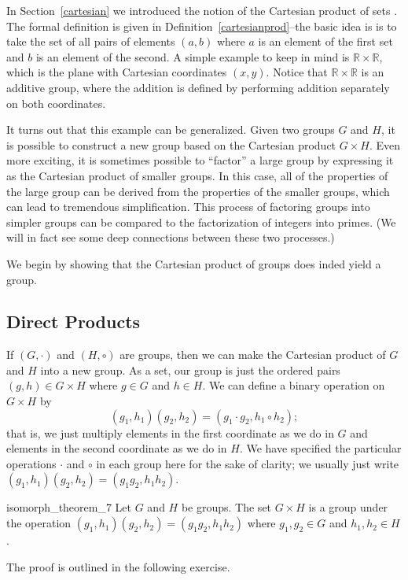 In Section~\ref{cartesian} we introduced the notion of the Cartesian product of sets . The formal definition is given in Definition~\ref{cartesianprod}--the basic idea is is to take the set of all pairs of elements $(a,b)$ where $a$ is an element of the first set and $b$ is an element of the second. A simple example to keep in mind is ${\mathbb R} \times {\mathbb R}$, which is the plane with Cartesian coordinates $(x,y)$. Notice that ${\mathbb R} \times {\mathbb R}$ is an additive group, where the addition is defined by performing addition separately on both coordinates. 

It turns out that this example can be generalized. Given two groups $G$ and $H$, it is possible to construct a new group based on the Cartesian product $G \times H$.  Even more exciting,  it is sometimes possible to ``factor'' a large group by expressing it as the Cartesian product of smaller groups. In this case, all of the properties of the large group can be derived from the properties of the smaller groups, which can lead to tremendous simplification. This  process of factoring groups into simpler groups can be compared to the factorization of integers into primes. (We will in fact see some deep connections between these two processes.)

We begin by showing that the Cartesian product of groups does inded yield a group.  
 
 
\subsection{ Direct Products}

If $(G,\cdot)$ and $(H, \circ)$ are groups, then we can make the Cartesian product of $G$ and $H$ into a new group.  As a set, our group is just the ordered pairs $(g, h) \in G \times H$ where $g \in G$ and $h \in H$. We can define a binary operation on $G \times H$ by 
\[
(g_1, h_1)(g_2, h_2) = (g_1 \cdot g_2, h_1 \circ h_2);
\]
that is, we just multiply elements in the first coordinate as we do in $G$ and elements in the second coordinate as we do in $H$.  We have specified the particular operations $\cdot$ and $\circ$ in each group here for the sake of clarity; we usually just write $(g_1, h_1)(g_2, h_2) = (g_1  g_2, h_1 h_2)$.  

\begin{prop}{isomorph_theorem_7}
Let $G$ and $H$ be groups. The set $G \times H$ is a group under the operation $(g_1, h_1)(g_2, h_2) = (g_1  g_2, h_1 h_2)$ where $g_1, g_2 \in G$ and $h_1, h_2 \in H$. 
\end{prop}
The proof is outlined in the following exercise. 

